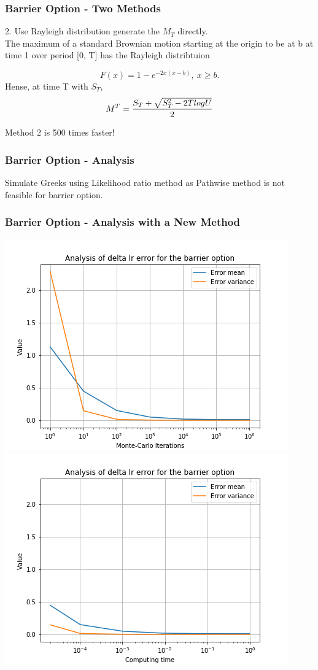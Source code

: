 \documentclass[12pt]{beamer}
\begin{document}
\begin{frame}
\frametitle{Barrier Option - Two Methods}

2. Use Rayleigh distribution generate the $M_T$ directly. \\
The maximum of a standard Brownian motion starting at the origin to be at b at time 1 over period [0, T] has the Rayleigh distribtuion

$$F(x) = 1 - e^{-2x(x-b)}, \ x \geq b.$$
Hense, at time T with $S_T$,
$$M^T={S_T+\sqrt{S_T^2-2TlogU}\over 2}$$

Method 2 is 500 times faster!

\end{frame}

\begin{frame}
\frametitle{Barrier Option - Analysis}
Simulate Greeks using Likelihood ratio method as Pathwise method is not feasible for barrier option.


\end{frame}

\begin{frame}
\frametitle{Barrier Option - Analysis with a New Method}
\includegraphics[width=.5\textwidth]{graphs/barrierdeltalr.png}
\includegraphics[width=.5\textwidth]{graphs/barrierdeltalrtime.png}
\end{frame}
\end{document}
